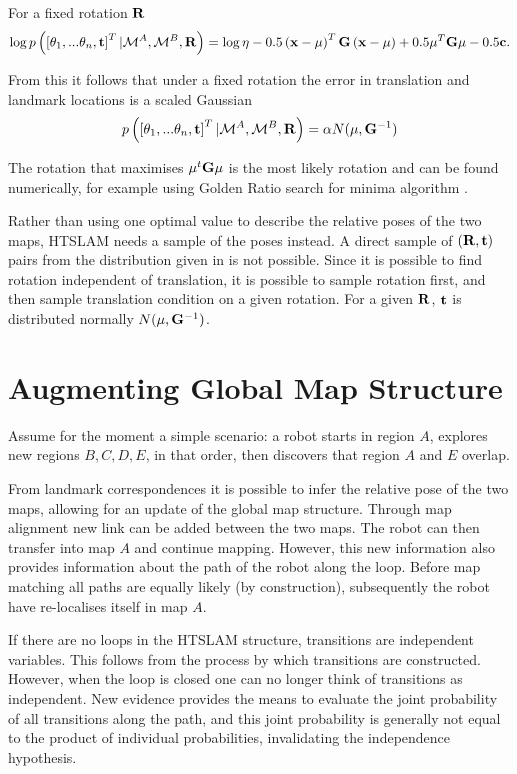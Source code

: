 For a fixed rotation ${\bf R}$ 
$$
\log p\left(\left[\theta_1, ...\theta_n,{\bf t} \right]^T | 
\mapA, \mapB,{\bf R} \right) =
\log \eta -0.5\left({\bf x - \mu}\right)^T{\bf G}\left( {\bf x - \mu} \right) +
0.5{\bf \mu}^T{\bf G\mu} -0.5 {\bf c}.
$$

From this it follows that under a fixed rotation the error in
translation and landmark locations is a scaled Gaussian
$$
p\left(\left[\theta_1, ...\theta_n,{\bf t}\right]^T | 
\mapA,\mapB,{\bf R}\right) 
= \alpha N({\bf \mu}, {\bf G}^{-1})
$$

The rotation that maximises $\mu^t{\bf G}\mu$ is the most likely
rotation and can be found numerically, for example using Golden Ratio
search for minima algorithm \cite{Pres92}.

Rather than using one optimal value to describe the relative poses of
the two maps, HTSLAM needs a sample of the poses instead. A direct
sample of $({\bf R,t})$ pairs from the distribution given in
 is not possible. Since it is possible to find
rotation independent of translation, it is possible to sample rotation
first, and then sample translation condition on a given rotation. For a
given ${\bf R}$, ${\bf t}$ is distributed normally $N(\mu, {\bf
G}^{-1})$.


\section{Augmenting Global Map Structure}
\label{sec:global_map_update}

Assume for the moment a simple scenario: a robot starts in
region $A$, explores new regions $B,C,D,E$, in that order, then
discovers that region $A$ and $E$ overlap.

From landmark correspondences it is possible to infer the relative
pose of the two maps, allowing for an update of the global map
structure. Through map alignment new link can be added between the two
maps. The robot can then transfer into map $A$ and continue mapping.
However, this new information also provides information about the path
of the robot along the loop. Before map matching all paths are equally
likely (by construction), subsequently the robot have re-localises
itself in map $A$.

If there are no loops in the HTSLAM structure, transitions are
independent variables. This follows from the process by which
transitions are constructed.  However, when the loop is closed one can
no longer think of transitions as independent. New evidence provides
the means to evaluate the joint probability of all transitions along
the path, and this joint probability is generally not equal to the
product of individual probabilities, invalidating the independence
hypothesis.


